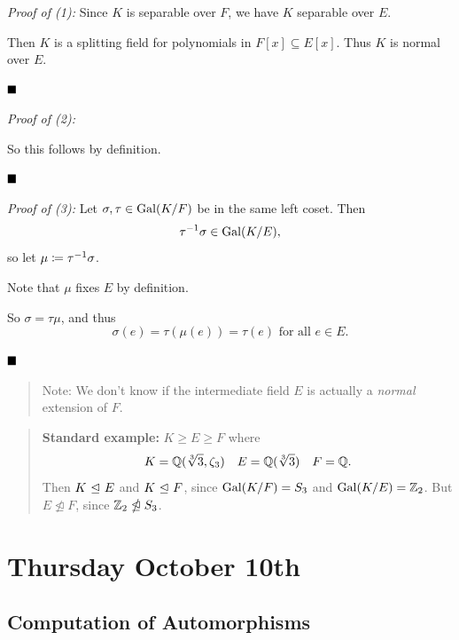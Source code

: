 \emph{Proof of (1):} Since \(K\) is separable over \(F\), we have \(K\)
separable over \(E\).

Then \(K\) is a splitting field for polynomials in
\(F[x] \subseteq E[x]\). Thus \(K\) is normal over \(E\).

\(\qed\)

\emph{Proof of (2):}

\begin{center}
\end{center}

So this follows by definition.

\(\qed\)

\emph{Proof of (3):} Let \(\sigma, \tau \in \mathrm{Gal}(K/F)\) be in the same
left coset. Then \[
\tau^{-1}\sigma \in \mathrm{Gal}(K/E)
,\] so let \(\mu \coloneqq \tau^{-1}\sigma\).

Note that \(\mu\) fixes \(E\) by definition.

So \(\sigma = \tau \mu\), and thus \[
\sigma(e) = \tau(\mu(e)) = \tau(e) \text{ for all } e\in E
.\]

\(\qed\)

\begin{quote}
Note: We don't know if the intermediate field \(E\) is actually a
\emph{normal} extension of \(F\).
\end{quote}

\begin{quote}
\textbf{Standard example:} \(K \geq E \geq F\) where \[
K = {\mathbb{Q}}(\sqrt[3] 3, \zeta_3)\quad E = {\mathbb{Q}}(\sqrt[3] 3) \quad F = {\mathbb{Q}}
.\] Then \(K {~\trianglelefteq~} E\) and \(K{~\trianglelefteq~} F\), since \(\mathrm{Gal}(K/F) = S_3\)
and \(\mathrm{Gal}(K/E) = {\mathbb{Z}}_2\). But \(E \ntrianglelefteq F\), since
\({\mathbb{Z}}_2 \ntrianglelefteq S_3\).
\end{quote}

\hypertarget{thursday-october-10th}{%
\section{Thursday October 10th}\label{thursday-october-10th}}

\hypertarget{computation-of-automorphisms}{%
\subsection{Computation of
Automorphisms}\label{computation-of-automorphisms}}

